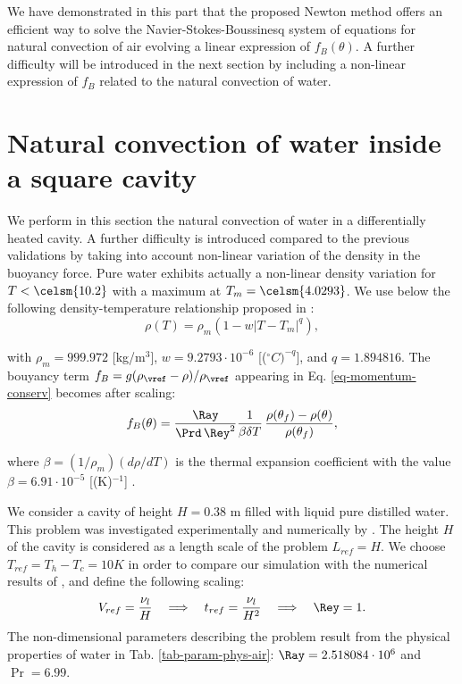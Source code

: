 We have demonstrated in this part that the proposed Newton method offers an efficient way to solve the Navier-Stokes-Boussinesq system of equations for natural convection of air evolving a linear expression of $f_B(\theta)$.
A further difficulty will be introduced in the next section by including a non-linear expression of $f_B$ related to the natural convection of water.

\section{Natural convection of water inside a square cavity}\label{sec: natconv-water}
We perform in this section the natural convection of water in a differentially heated cavity. 
A further difficulty is introduced compared to the previous validations by taking into account non-linear variation of the density in the buoyancy force.
Pure water exhibits actually a non-linear density variation for $T< \celsm{10.2}$ with a maximum at $T_m= \celsm{4.0293}$. 
We use below the following density-temperature relationship  proposed in \cite{Gebhart1977}:
\begin{equation}\label{eq-dens-nonlin}
\rho(T)=\rho_m \left(1 - w \left|T - T_m\right|^q\right),
\end{equation}

\noindent with $\rho_m=999.972$ [kg/m$^3$], $w=9.2793\cdot 10^{-6}$ [($^\circ C)^{-q}$], and $q=1.894816$.
The bouyancy term $f_B = g(\rho_\vref-\rho)/\rho_\vref$ appearing in Eq. \ref{eq-momentum-conserv}  becomes after scaling:
\begin{equation}
f_B(\theta) = \frac{\Ray}{\Prd \, \Rey^2} \frac{1}{\beta \delta T}\, \frac{\rho(\theta_f)-\rho(\theta)}{\rho(\theta_f)},
\label{eq-fBnonlin}
\end{equation}

\noindent where $\beta=(1/\rho_m) \left(d\rho/dT\right)$ is the thermal expansion coefficient with the value $\beta=6.91 \cdot 10^{-5}$ [(K)$^{-1}$] \citep{Scanlon2004}.

We consider a cavity of height $H = 0.38$ m filled with liquid pure distilled water.
This problem was investigated experimentally and numerically by \cite{Giangi-2000,Kowalewski-1999,Kowalewski-2003}.
The height $H$ of the cavity is considered as a length scale of the problem $L_{ref} = H$. 
We choose $T_{ref} = T_h - T_c = 10 K$ in order to compare our simulation with the numerical results of \cite{Kowalewski-2003},
and define the following scaling:
\begin{equation} \label{eq-def-scal-1}
   V_{ref} = \frac{\nu_l}{H} 
   \quad \Longrightarrow \quad t_{ref} = \frac{\nu_l}{H^2}
   \quad \Longrightarrow \quad \Rey = 1.
\end{equation} 
The non-dimensional parameters describing the problem result from the physical properties of water in Tab. \ref{tab-param-phys-air}: $\Ray=2.518084\cdot 10^{6}$ and $\Pr=6.99$. %

